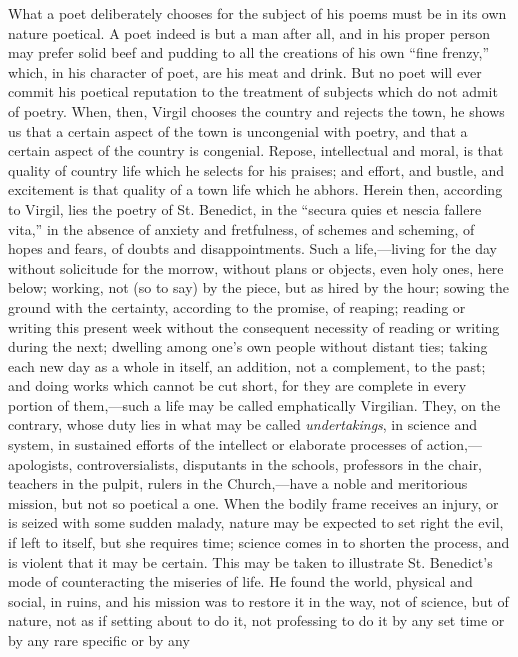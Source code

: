 What a poet deliberately chooses for the subject of his poems must
be in its own nature poetical. A poet indeed is but a man after all,
and in his proper person may prefer solid beef and pudding to all the
creations of his own ``fine frenzy,'' which, in his character
of poet, are his meat and drink. But no poet will ever commit his
poetical reputation to the treatment of subjects which do not
admit of poetry. When, then, Virgil chooses the country and rejects
the town, he shows us that a certain aspect of the town is uncongenial
with poetry, and that a certain aspect of the country is congenial.
Repose, intellectual and moral, is that quality of country life which
he selects for his praises; and effort, and bustle, and excitement is
that quality of a town life which he abhors. Herein then, according to
Virgil, lies the poetry of St. Benedict, in the ``secura quies et
nescia fallere vita,'' in the absence of anxiety and fretfulness,
of schemes and scheming, of hopes and fears, of doubts and
disappointments. Such a life,—living for the day without solicitude
for the morrow, without plans or objects, even holy ones, here below;
working, not (so to say) by the piece, but as hired by the hour;
sowing the ground with the certainty, according to the promise, of
reaping; reading or writing this present week without the consequent
necessity of reading or writing during the next; dwelling among one's
own people without distant ties; taking each new day as a whole in
itself, an addition, not a complement, to the past; and doing works
which cannot be cut short, for they are complete in every portion of
them,—such a life may be called emphatically Virgilian. They, on the
contrary, whose duty lies in what may be called \emph{undertakings},
in science and system, in sustained efforts of the intellect or
elaborate processes of action,—apologists, controversialists,
disputants in the schools, professors in the chair, teachers in the
pulpit, rulers in the Church,—have a noble and meritorious mission,
but not so poetical a one. When the bodily frame receives an injury,
or is seized with some sudden malady, nature may be expected to set
right the evil, if left to itself, but she requires time; science
comes in to shorten the process, and is violent that it may be
certain. This may be taken to illustrate St. Benedict's mode of
counteracting the miseries of life. He found the world, physical and
social, in ruins, and his mission was to restore it in the way, not of
science, but of nature, not as if setting about to do it, not
professing to do it by any set time or by any rare specific or by any

